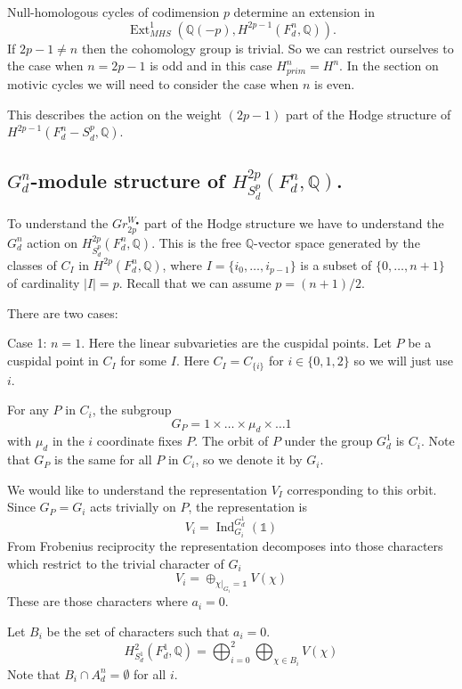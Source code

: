\documentclass[12pt,reqno]{article}
\newcommand {\Q}{{\mathds Q}}
\def\Ind{\operatorname{Ind}}
\def\Ext{\operatorname{Ext}}
\begin{document}
	
	Null-homologous cycles of codimension $p$  determine an extension in 
	$$\Ext^1_{MHS}(\Q(-p), H^{2p-1}(F_d^n,\Q)).$$
	If $2p-1 \neq n$ then the cohomology group is trivial. So we can restrict ourselves to the case when $n=2p-1$ is odd  and in this case $H^n_{prim}=H^n$. In the section on motivic cycles we will need to consider the case when $n$ is even. 
	
	
	
	
This describes the action on the weight $(2p-1)$ part of the Hodge structure of $H^{2p-1}(F_d^n-S_d^p,\Q)$. 

\subsection{$G_d^n$-module structure of $H^{2p}_{S_d^p}(F_d^n,\Q)$.}

To understand the $Gr_{2p}^{W_{\bullet}}$ part of the Hodge structure we have to understand the $G_d^n$ action on $H^{2p}_{S_d^p}(F_d^n,\Q)$. This is the free $\Q$-vector space generated by the classes of $C_I$ in $H^{2p}(F_d^n,\Q)$, where $I=\{i_0,\dots,i_{p-1}\}$ is a subset of $\{0,\dots,n+1\}$ of cardinality $|I|=p$. Recall that we can assume $p=(n+1)/2$. 

There are two cases:

\noindent Case 1: $n=1$. Here the linear subvarieties  are the cuspidal points. Let $P$ be a cuspidal point in $C_I$ for some $I$. Here $C_I=C_{\{i\}}$ for  $i\in \{0,1,2\}$ so we will just use $i$. 

For any $P$ in $C_i$, the subgroup  
%
$$G_P=1\times\dots \times \mu_d \times \dots 1$$
%
with $\mu_d$ in the $i$ coordinate fixes $P$. The orbit of $P$ under the group $G_d^1$ is $C_i$. Note that $G_P$ is the same for all $P$ in $C_i$,  so we denote it by $G_i$. 

We would like to understand the representation $V_I$ corresponding to this orbit. Since $G_P=G_i$ acts trivially on $P$, the representation is 
%
$$V_i=\Ind_{G_i}^{G_d^1} ({\mathds 1})$$
%
From  Frobenius reciprocity the representation decomposes into those characters which restrict to the trivial character of $G_i$ 
%
$$V_i=\oplus_{\chi|_{G_i}={\mathds 1}} V(\chi)$$
%
These are those characters where $a_i=0$.

Let $B_i$ be the set of characters such that $a_i=0$. 
%
$$H^{2}_{S_d^1}(F_d^1,\Q)=\bigoplus_{i=0}^2 \bigoplus_{\chi \in B_i } V(\chi)$$
%
Note that $B_i \cap A_d^n=\emptyset$ for all $i$. 

\vspace{\baselineskip}
\end{document}
